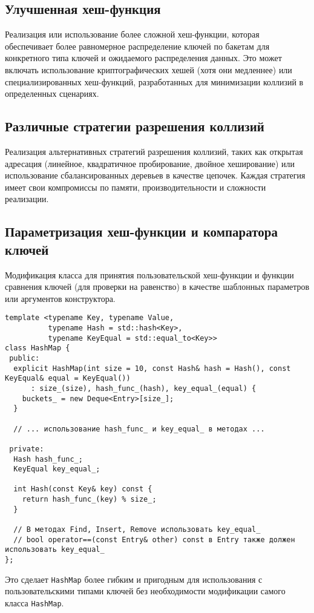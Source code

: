 \documentclass[a4paper,12pt]{article}
\begin{document}
\subsection{Улучшенная хеш-функция}

Реализация или использование более сложной хеш-функции, которая обеспечивает более равномерное распределение ключей по бакетам для конкретного типа ключей и ожидаемого распределения данных. Это может включать использование криптографических хешей (хотя они медленнее) или специализированных хеш-функций, разработанных для минимизации коллизий в определенных сценариях.

\subsection{Различные стратегии разрешения коллизий}

Реализация альтернативных стратегий разрешения коллизий, таких как открытая адресация (линейное, квадратичное пробирование, двойное хеширование) или использование сбалансированных деревьев в качестве цепочек. Каждая стратегия имеет свои компромиссы по памяти, производительности и сложности реализации.

\subsection{Параметризация хеш-функции и компаратора ключей}

Модификация класса для принятия пользовательской хеш-функции и функции сравнения ключей (для проверки на равенство) в качестве шаблонных параметров или аргументов конструктора.

\begin{lstlisting}[style=cpp]
template <typename Key, typename Value, 
          typename Hash = std::hash<Key>, 
          typename KeyEqual = std::equal_to<Key>>
class HashMap {
 public:
  explicit HashMap(int size = 10, const Hash& hash = Hash(), const KeyEqual& equal = KeyEqual())
      : size_(size), hash_func_(hash), key_equal_(equal) {
    buckets_ = new Deque<Entry>[size_];
  }
  
  // ... использование hash_func_ и key_equal_ в методах ...
  
 private:
  Hash hash_func_;
  KeyEqual key_equal_;
  
  int Hash(const Key& key) const {
    return hash_func_(key) % size_;
  }
  
  // В методах Find, Insert, Remove использовать key_equal_
  // bool operator==(const Entry& other) const в Entry также должен использовать key_equal_
};
\end{lstlisting}
Это сделает \texttt{HashMap} более гибким и пригодным для использования с пользовательскими типами ключей без необходимости модификации самого класса \texttt{HashMap}.
\end{document}
